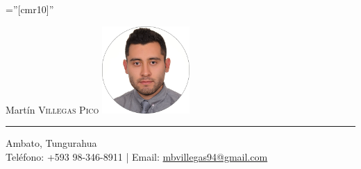 \documentclass[a4paper,10.9pt]{article}
\begin{document}
  




\font\fb=''[cmr10]'' %


{ \Huge Martín \textsc{Villegas Pico}}\hfill
\includegraphics[width=9em]{img/martin.png} \\
\textcolor{black!30}{\rule[.1\baselineskip]{\textwidth}{1pt}}

\begin{center}
Ambato, Tungurahua\\
Teléfono: +593 98-346-8911 | Email: \href{mailto:mbvillegas94@gmail.com}{mbvillegas94@gmail.com}
\end{center}


%
\end{document}
